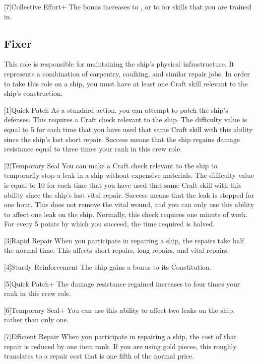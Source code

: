         [7]{Collective Effort+} The bonus increases to , or to  for skills that you are trained in.

    \subsection{Fixer}
        This role is responsible for maintaining the ship's physical infrastructure.
        It represents a combination of carpentry, caulking, and similar repair jobs.
        In order to take this role on a ship, you must have at least one Craft skill relevant to the ship's construction.

        [1]{Quick Patch} As a standard action, you can attempt to patch the ship's defenses.
        This requires a Craft check relevant to the ship.
        The difficulty value is equal to 5  for each time that you have used that same Craft skill with this ability since the ship's last short repair.
        Success means that the ship regains damage resistance equal to three times your rank in this crew role.

        [2]{Temporary Seal} You can make a Craft check relevant to the ship to temporarily stop a leak in a ship without expensive materials.
        The difficulty value is equal to 10  for each time that you have used that same Craft skill with this ability since the ship's last vital repair.
        Success means that the leak is stopped for one hour.
        This does not remove the vital wound, and you can only use this ability to affect one leak on the ship.
        Normally, this check requires one minute of work.
        For every 5 points by which you succeed, the time required is halved.

        [3]{Rapid Repair} When you participate in repairing a ship, the repairs take half the normal time.
        This affects short repairs, long repairs, and vital repairs.

        [4]{Sturdy Reinforcement} The ship gains a  bonus to its Constitution.

        [5]{Quick Patch+} The damage resistance regained increases to four times your rank in this crew role.

        [6]{Temporary Seal+} You can use this ability to affect two leaks on the ship, rather than only one.

        [7]{Efficient Repair} When you participate in repairing a ship, the cost of that repair is reduced by one item rank.
        If you are using gold pieces, this roughly translates to a repair cost that is one fifth of the normal price.

